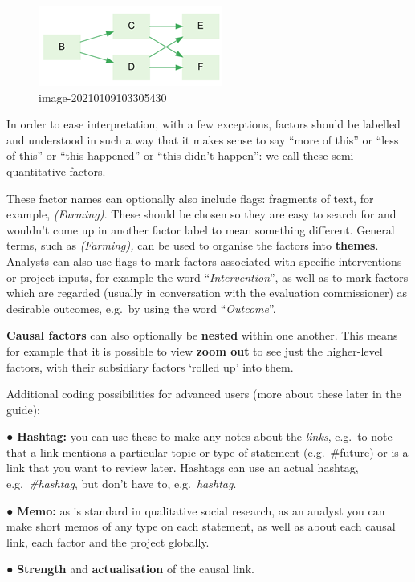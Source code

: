 \documentclass[
]{book}
\begin{document}
\begin{figure}
\centering
\includegraphics{_assets/image-20210109103305430.png}
\caption{image-20210109103305430}
\end{figure}

In order to ease interpretation, with a few exceptions, factors should be labelled and understood in such a way that it makes sense to say ``more of this'' or ``less of this'' or ``this happened'' or ``this didn't happen'': we call these semi-quantitative factors.

These factor names can optionally also include flags: fragments of text, for example, \emph{(Farming).} These should be chosen so they are easy to search for and wouldn't come up in another factor label to mean something different. General terms, such as \emph{(Farming),} can be used to organise the factors into \textbf{themes}. Analysts can also use flags to mark factors associated with specific interventions or project inputs, for example the word ``\emph{Intervention}'', as well as to mark factors which are regarded (usually in conversation with the evaluation commissioner) as desirable outcomes, e.g.~by using the word ``\emph{Outcome}''.

\textbf{Causal factors} can also optionally be \textbf{nested} within one another. This means for example that it is possible to view \textbf{zoom out} to see just the higher-level factors, with their subsidiary factors `rolled up' into them.

Additional coding possibilities for advanced users (more about these later in the guide):

● \textbf{Hashtag:} you can use these to make any notes about the \emph{links}, e.g.~to note that a link mentions a particular topic or type of statement (e.g.~\#future) or is a link that you want to review later. Hashtags can use an actual hashtag, e.g.~\emph{\#hashtag}, but don't have to, e.g.~\emph{hashtag}.

● \textbf{Memo:} as is standard in qualitative social research, as an analyst you can make short memos of any type on each statement, as well as about each causal link, each factor and the project globally.

● \textbf{Strength} and \textbf{actualisation} of the causal link.
\end{document}
